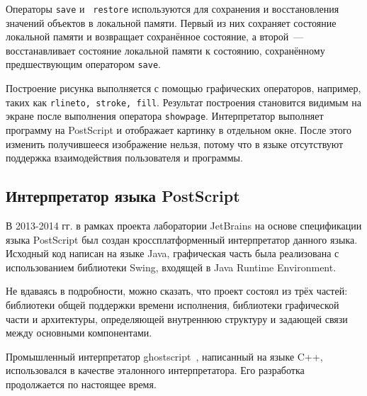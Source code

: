 Операторы \texttt{save} и \texttt{ restore} используются для сохранения и восстановления значений объектов в локальной памяти. Первый из них сохраняет состояние локальной памяти и возвращает сохранённое состояние, а второй~--- восстанавливает  состояние локальной памяти к состоянию, сохранённому предшествующим оператором \texttt{save}.


Построение рисунка выполняется с помощью графических операторов, например, таких как \texttt{rlineto, stroke, fill}. Результат построения становится видимым на экране после выполнения оператора \texttt{showpage}. Интерпретатор выполняет программу на PostScript и отображает картинку в отдельном окне. После этого изменить получившееся изображение нельзя, потому что в языке отсутствуют поддержка взаимодействия пользователя и программы.





\subsection{Интерпретатор языка PostScript}

В 2013-2014 гг. в рамках проекта лаборатории JetBrains на основе спецификации языка PostScript был создан кроссплатформенный интерпретатор данного языка. Исходный код написан на языке Java, графическая часть была реализована с использованием библиотеки Swing, входящей в Java Runtime Environment.

Не вдаваясь в подробности, можно сказать, что проект состоял из трёх частей: библиотеки общей поддержки времени исполнения, библиотеки графической части и архитектуры, определяющей внутреннюю структуру и задающей связи между основными компонентами. 

Промышленный интерпретатор ghostscript~\cite{wiki:ghostscript}, написанный на языке C++, использовался в качестве эталонного интерпретатора.  Его разработка продолжается по настоящее время.


